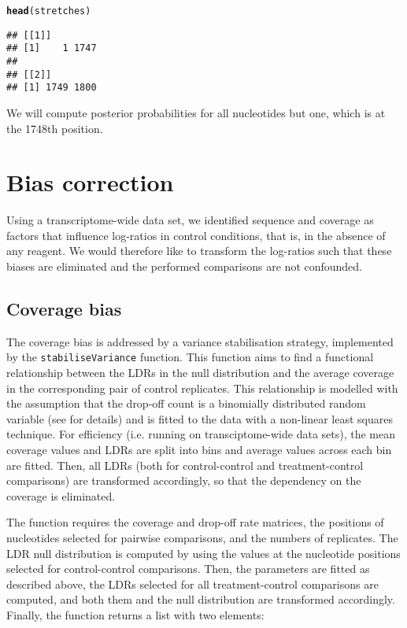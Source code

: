\documentclass{article}\usepackage[]{graphicx}\usepackage[]{color}
\makeatletter
\newcommand{\hlstd}[1]{\textcolor[rgb]{0.345,0.345,0.345}{#1}}%
\newcommand{\hlkwd}[1]{\textcolor[rgb]{0.737,0.353,0.396}{\textbf{#1}}}%
\newenvironment{kframe}{%
 \def\at@end@of@kframe{}%
 \ifinner\ifhmode%
  \def\at@end@of@kframe{\end{minipage}}%
  \begin{minipage}{\columnwidth}%
 \fi\fi%
 \def\FrameCommand##1{\hskip\@totalleftmargin \hskip-\fboxsep
 \colorbox{shadecolor}{##1}\hskip-\fboxsep
     \hskip-\linewidth \hskip-\@totalleftmargin \hskip\columnwidth}%
 \MakeFramed {\advance\hsize-\width
   \@totalleftmargin\z@ \linewidth\hsize
   \@setminipage}}%
 {\par\unskip\endMakeFramed%
 \at@end@of@kframe}
\newenvironment{knitrout}{}{} %
\makeatother
\begin{document}
\begin{knitrout}
\color{fgcolor}\begin{kframe}
\begin{alltt}
\hlkwd{head}\hlstd{(stretches)}
\end{alltt}
\begin{verbatim}
## [[1]]
## [1]    1 1747
## 
## [[2]]
## [1] 1749 1800
\end{verbatim}
\end{kframe}
\end{knitrout}

We will compute posterior probabilities for all nucleotides but one, which is at
the 1748th position.

\section{Bias correction}

Using a transcriptome-wide data set, we identified sequence and coverage as
factors that influence log-ratios in control conditions, that is, in the absence
of any reagent. We would therefore like to transform the log-ratios such that
these biases are eliminated and the performed comparisons are not confounded.

\subsection{Coverage bias}

The coverage bias is addressed by a variance stabilisation strategy, implemented
by the \texttt{stabiliseVariance} function. This function aims to find a
functional relationship between the LDRs in the null distribution and the
average coverage in the corresponding pair of control replicates. This
relationship is modelled with the assumption that the drop-off count is a
binomially distributed random variable (see \cite{selega2016robust} for details)
and is fitted to the data with a non-linear least squares technique. For
efficiency (i.e. running on transciptome-wide data sets), the mean coverage
values and LDRs are split into bins and average values across each bin are
fitted. Then, all LDRs (both for control-control and treatment-control
comparisons) are transformed accordingly, so that the dependency on the coverage
is eliminated.

The function requires the coverage and drop-off rate matrices, the positions of
nucleotides selected for pairwise comparisons, and the numbers of replicates.
The LDR null distribution is computed by using the values at the nucleotide
positions selected for control-control comparisons. Then, the parameters are
fitted as described above, the LDRs selected for all treatment-control
comparisons are computed, and both them and the null distribution are
transformed accordingly. Finally, the function returns a list with two elements:
\end{document}
